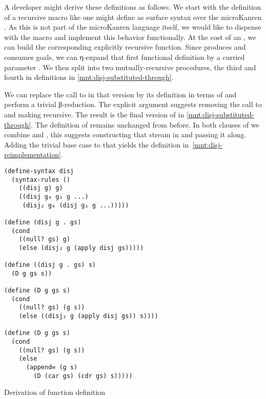\documentclass[sigplan,balance,pbalance,natbib=false]{acmart}
\begin{document}
A developer might derive these definitions as follows. We start with
the definition of a recursive  macro like one might
define as surface syntax over the microKanren . As
this is not part of the microKanren language itself, we would like to
dispense with the macro and implement this behavior functionally. At
the cost of an , we can build the corresponding
explicitly recursive  function.
Since  produces and consumes goals, we can η-expand
that first functional definition by a curried
parameter . We then split  into two
mutually-recursive procedures, the third and fourth in definitions in
\cref{mnt:disj-substituted-through}.

We can replace the call to  in that version by its
definition in terms of  and perform a trivial
β-reduction. The explicit  argument suggests removing
the call to  and making  recursive.
The result is the final version of  in
\cref{mnt:disj-substituted-through}. The definition
of  remains unchanged from before. In both clauses
of  we combine  and , this
suggests constructing that stream in  and passing it
along. Adding the trivial base case to that  yields
the definition in~\cref{mnt:disj-reimplementation}.

\begin{listing}
\begin{verbatim}
(define-syntax disj
  (syntax-rules ()
    ((disj g) g)
    ((disj g₀ g₁ g ...)
     (disj₂ g₀ (disj g₁ g ...)))))

(define (disj g . gs)
  (cond
    ((null? gs) g)
    (else (disj₂ g (apply disj gs)))))

(define ((disj g . gs) s)
  (D g gs s))

(define (D g gs s)
  (cond
    ((null? gs) (g s))
    (else ((disj₂ g (apply disj gs)) s))))

(define (D g gs s)
  (cond
    ((null? gs) (g s))
    (else
      (append∞ (g s)
        (D (car gs) (cdr gs) s)))))
\end{verbatim}
  \caption{Derivation of  function definition}\label{mnt:disj-substituted-through}
\end{listing}
\end{document}
